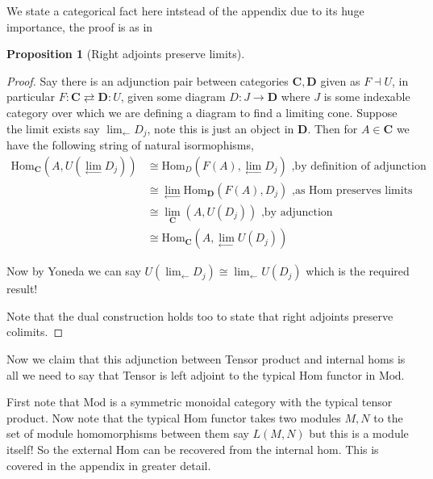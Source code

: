 \documentclass[12pt]{article}
\numberwithin{equation}{section}
\newcommand{\Hom}{{\mathrm{Hom}}}
\newtheorem{proposition}{Proposition}[section]
\begin{document}
	We state a categorical fact here intstead of the appendix due to its huge importance, the proof is as in \cite{Awodey}
	\begin{proposition}[Right adjoints preserve limits]
	\end{proposition}
	\begin{proof}
		Say there is an adjunction pair between categories $\mathbf{C, D}$ given as $F \dashv U$, in particular $F: \mathbf{C} \rightleftarrows \mathbf{D}:U$, given some diagram $D:J \to \mathbf{D}$ where $J$ is some indexable category over which we are defining a diagram to find a limiting cone. Suppose the limit exists say $\lim_{\leftarrow} D_j$, note this is just an object in $\mathbf{D}$. Then for $A \in \mathbf{C}$ we have the following string of natural isormophisms,
		\begin{align*}
			\Hom_\mathbf{C}(A,U(\lim_{\leftarrow} D_j)) &\cong \Hom_D(F(A), \lim_{\leftarrow} D_j) \text{ ,by definition of adjunction}\\
			&\cong \lim_{\leftarrow} \Hom_\mathbf{D}(F(A), D_j) \text{ ,as Hom preserves limits}\\
			&\cong \lim_{\mathbf{C}}(A,U(D_j)) \text{ ,by adjunction}\\
			&\cong \Hom_{\mathbf{C}}(A, \lim_{\leftarrow} U (D_j))
		\end{align*}
		
		Now by Yoneda we can say $U(\lim_{\leftarrow} D_j) \cong \lim_{\leftarrow} U(D_j)$ which is the required result!
		
		Note that the dual construction holds too to state that right adjoints preserve colimits.
	\end{proof}
	
	
	Now we claim that this adjunction between Tensor product and internal homs is all we need to say that Tensor is left adjoint to the typical Hom functor in $\mathrm{Mod}$. 
	
	First note that $\mathrm{Mod}$ is a symmetric monoidal category with the typical tensor product. Now note that the typical Hom functor takes two modules $M, N$ to the set of module homomorphisms between them say $L(M,N)$ but this is a module itself! So the external Hom can be recovered from the internal hom. This is covered in the appendix in greater detail.
	
\end{document}
